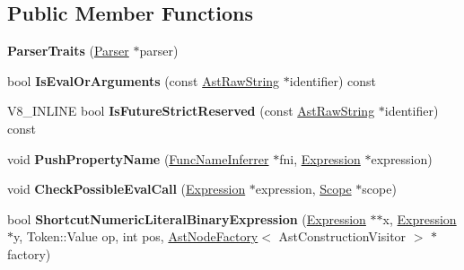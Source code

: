 \subsection*{Public Member Functions}
\begin{DoxyCompactItemize}
\item 
\hypertarget{classv8_1_1internal_1_1_parser_traits_abfb6b57f03bde44ebd57ba82060e853c}{}{\bfseries Parser\+Traits} (\hyperlink{classv8_1_1internal_1_1_parser}{Parser} $\ast$parser)\label{classv8_1_1internal_1_1_parser_traits_abfb6b57f03bde44ebd57ba82060e853c}

\item 
\hypertarget{classv8_1_1internal_1_1_parser_traits_a9a797b80683da1e025032f06da7791f4}{}bool {\bfseries Is\+Eval\+Or\+Arguments} (const \hyperlink{classv8_1_1internal_1_1_ast_raw_string}{Ast\+Raw\+String} $\ast$identifier) const \label{classv8_1_1internal_1_1_parser_traits_a9a797b80683da1e025032f06da7791f4}

\item 
\hypertarget{classv8_1_1internal_1_1_parser_traits_accd89a1f7c3e9eb5f43c0991bc4f0534}{}V8\+\_\+\+I\+N\+L\+I\+N\+E bool {\bfseries Is\+Future\+Strict\+Reserved} (const \hyperlink{classv8_1_1internal_1_1_ast_raw_string}{Ast\+Raw\+String} $\ast$identifier) const \label{classv8_1_1internal_1_1_parser_traits_accd89a1f7c3e9eb5f43c0991bc4f0534}

\item 
\hypertarget{classv8_1_1internal_1_1_parser_traits_a84e5b3ddf79722029810dcdd8c32e2a6}{}void {\bfseries Push\+Property\+Name} (\hyperlink{classv8_1_1internal_1_1_func_name_inferrer}{Func\+Name\+Inferrer} $\ast$fni, \hyperlink{classv8_1_1internal_1_1_expression}{Expression} $\ast$expression)\label{classv8_1_1internal_1_1_parser_traits_a84e5b3ddf79722029810dcdd8c32e2a6}

\item 
\hypertarget{classv8_1_1internal_1_1_parser_traits_abf6cbe72ad9fa19a6a2093822a128b4e}{}void {\bfseries Check\+Possible\+Eval\+Call} (\hyperlink{classv8_1_1internal_1_1_expression}{Expression} $\ast$expression, \hyperlink{classv8_1_1internal_1_1_scope}{Scope} $\ast$scope)\label{classv8_1_1internal_1_1_parser_traits_abf6cbe72ad9fa19a6a2093822a128b4e}

\item 
\hypertarget{classv8_1_1internal_1_1_parser_traits_ab91c8f4eb6eb72451648e54f9ac0cc8f}{}bool {\bfseries Shortcut\+Numeric\+Literal\+Binary\+Expression} (\hyperlink{classv8_1_1internal_1_1_expression}{Expression} $\ast$$\ast$x, \hyperlink{classv8_1_1internal_1_1_expression}{Expression} $\ast$y, Token\+::\+Value op, int pos, \hyperlink{classv8_1_1internal_1_1_ast_node_factory}{Ast\+Node\+Factory}$<$ Ast\+Construction\+Visitor $>$ $\ast$factory)\label{classv8_1_1internal_1_1_parser_traits_ab91c8f4eb6eb72451648e54f9ac0cc8f}


\end{DoxyCompactItemize}
